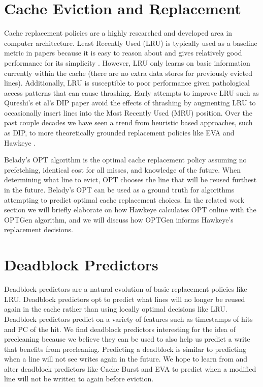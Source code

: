 \section{Cache Eviction and Replacement}
Cache replacement policies are a highly researched and developed area in computer architecture. Least Recently Used (LRU) is typically used as a baseline metric in papers because it is easy to reason about and gives relatively good performance for its simplicity \cite{lruperf}. However, LRU only learns on basic information currently within the cache (there are no extra data stores for previously evicted lines). Additionally, LRU is susceptible to poor performance given pathological access patterns that can cause thrashing. Early attempts to improve LRU such as Qureshi’s et al’s DIP paper \cite{dip} avoid the effects of thrashing by augmenting LRU to occasionally insert lines into the Most Recently Used (MRU) position. Over the past couple decades we have seen a trend from heuristic based approaches, such as DIP, to more theoretically grounded replacement policies like EVA \cite{eva} and Hawkeye \cite{hawkeye}.

Belady’s OPT algorithm \cite{belady_opt} is the optimal cache replacement policy assuming no prefetching, identical cost for all misses, and knowledge of the future. When determining what line to evict, OPT chooses the line that will be reused furthest in the future. Belady’s OPT can be used as a ground truth for algorithms attempting to predict optimal cache replacement choices. In the related work section we will briefly elaborate on how Hawkeye calculates OPT online with the OPTGen algorithm, and we will discuss how OPTGen informs Hawkeye’s replacement decisions.

\section{Deadblock Predictors}
Deadblock predictors \cite{deadblock} are a natural evolution of basic replacement policies like LRU. Deadblock predictors opt to predict what lines will no longer be reused again in the cache rather than using locally optimal decisions like LRU. Deadblock predictors predict on a variety of features such as timestamps of hits and PC of the hit. We find deadblock predictors interesting for the idea of precleaning because we believe they can be used to also help us predict a write that benefits from precleaning. Predicting a deadblock is similar to predicting when a line will not see writes again in the future. We hope to learn from and alter deadblock predictors like Cache Burst \cite{cache_burst} and EVA \cite{eva} to predict when a modified line will not be written to again before eviction.
